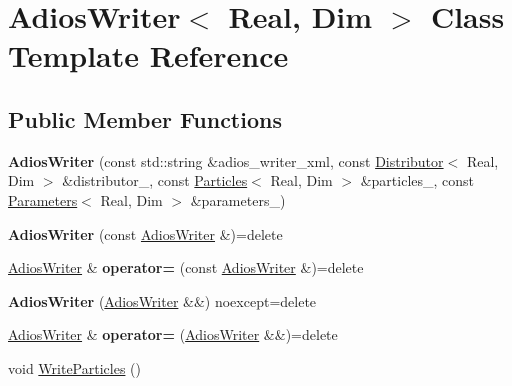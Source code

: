 \hypertarget{classAdiosWriter}{}\section{Adios\+Writer$<$ Real, Dim $>$ Class Template Reference}
\label{classAdiosWriter}
\subsection*{Public Member Functions}
\begin{DoxyCompactItemize}
\item 
\hypertarget{classAdiosWriter_a51608b20d79e69dca7e1a8e9f6899cb4}{}{\bfseries Adios\+Writer} (const std\+::string \&adios\+\_\+writer\+\_\+xml, const \hyperlink{classDistributor}{Distributor}$<$ Real, Dim $>$ \&distributor\+\_\+, const \hyperlink{classParticles}{Particles}$<$ Real, Dim $>$ \&particles\+\_\+, const \hyperlink{classParameters}{Parameters}$<$ Real, Dim $>$ \&parameters\+\_\+)\label{classAdiosWriter_a51608b20d79e69dca7e1a8e9f6899cb4}

\item 
\hypertarget{classAdiosWriter_a0e7286883597308c953d3822c78b2aab}{}{\bfseries Adios\+Writer} (const \hyperlink{classAdiosWriter}{Adios\+Writer} \&)=delete\label{classAdiosWriter_a0e7286883597308c953d3822c78b2aab}

\item 
\hypertarget{classAdiosWriter_af3d244b8ec6c45ca140dae5f992eb9ba}{}\hyperlink{classAdiosWriter}{Adios\+Writer} \& {\bfseries operator=} (const \hyperlink{classAdiosWriter}{Adios\+Writer} \&)=delete\label{classAdiosWriter_af3d244b8ec6c45ca140dae5f992eb9ba}

\item 
\hypertarget{classAdiosWriter_a5fb32706200c08a7c2f4f2e6aa1768aa}{}{\bfseries Adios\+Writer} (\hyperlink{classAdiosWriter}{Adios\+Writer} \&\&) noexcept=delete\label{classAdiosWriter_a5fb32706200c08a7c2f4f2e6aa1768aa}

\item 
\hypertarget{classAdiosWriter_a54a40b63a55d6aaef0dbcb074f4bcba0}{}\hyperlink{classAdiosWriter}{Adios\+Writer} \& {\bfseries operator=} (\hyperlink{classAdiosWriter}{Adios\+Writer} \&\&)=delete\label{classAdiosWriter_a54a40b63a55d6aaef0dbcb074f4bcba0}

\item 
void \hyperlink{classAdiosWriter_ac26ceaab9a7ecda73c2cd4d2d9117afa}{Write\+Particles} ()
\end{DoxyCompactItemize}


